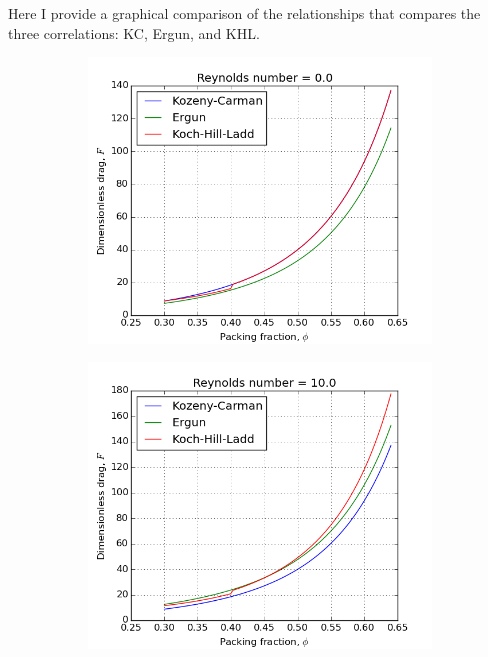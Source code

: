 Here I provide a graphical comparison of the relationships that compares the three correlations: KC, Ergun, and KHL.
\begin{figure}[!ht]
    \centering
    \begin{subfigure}[b]{0.45\textwidth}
        \centering
        \includegraphics[width=\textwidth]{figures/pressure-drop-correlations/Re0.png}
    \end{subfigure}
    \begin{subfigure}[b]{0.45\textwidth}
        \centering
        \includegraphics[width=\textwidth]{figures/pressure-drop-correlations/Re10.png}
    \end{subfigure}
    

\end{figure}
